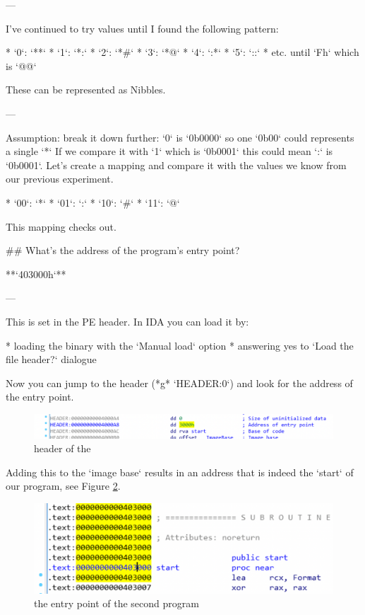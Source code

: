 \begin{markdown}

---

\noindent\s I've continued to try values until I found the following pattern:

* `0`: `**`
* `1`: `*:`
* `2`: `*#`
* `3`: `*@`
* `4`: `:*`
* `5`: `::`
* etc. until `Fh` which is `@@`

\noindent\s These can be represented as Nibbles.

---

\noindent\s Assumption: break it down further:
`0` is `0b0000` so one `0b00` could represents a single `*`
If we compare it with `1` which is `0b0001` this could mean `:` is `0b0001`. Let's create a mapping and compare it with the values we know from our previous experiment.\s

* `00`: `*`
* `01`: `:`
* `10`: `#`
* `11`: `@`

\noindent\s This mapping checks out.

## What’s the address of the program’s entry point?

**`403000h`**

---

This is set in the PE header. In IDA you can load it by:\s

* loading the binary with the `Manual load` option
* answering yes to `Load the file header?` dialogue

\noindent\s Now you can jump to the header (*g* `HEADER:0`) and look for the address of the entry point.

\begin{figure}[!htbp]
\centering
\includegraphics[width=\linewidth]{media/entry.png}
\caption{header of the }\label{entry}
\end{figure}

\noindent Adding this to the `image base` results in an address that is indeed the `start` of our program, see Figure \ref{entrypoint}.

\begin{figure}[!htbp]
\centering
\includegraphics[width=\linewidth]{media/entrypoint.png}
\caption{the entry point of the second program}\label{entrypoint}
\end{figure}


\end{markdown}
